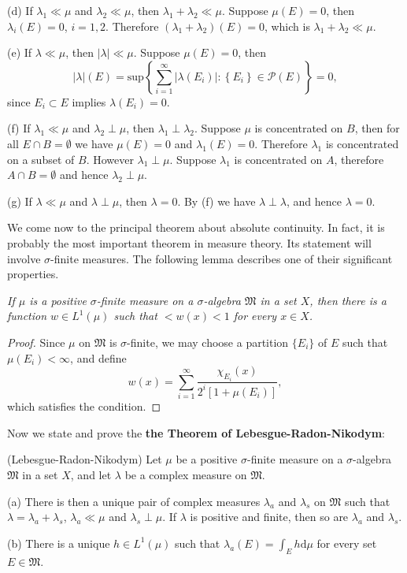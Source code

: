 (d) If $\lambda_1\ll\mu$ and $\lambda_2\ll\mu$, then $\lambda_1+\lambda_2\ll\mu$. Suppose $\mu(E)=0$, then $\lambda_i(E)=0$, $i=1,2$. Therefore $(\lambda_1+\lambda_2)(E)=0$, which is $\lambda_1+\lambda_2\ll\mu$.\par
(e) If $\lambda\ll\mu$, then $|\lambda|\ll\mu$. Suppose $\mu(E)=0$, then 
$$
\left| \lambda \right|\left( E \right) =\mathrm{sup}\left\{ \sum_{i=1}^{\infty}{\left| \lambda \left( E_i \right) \right|}:\left\{ E_i \right\} \in \mathcal{P} \left( E \right) \right\} =0,
$$
since $E_i\subset E$ implies $\lambda(E_i)=0$.\par
(f) If $\lambda_1\ll\mu$ and $\lambda_2\perp\mu$, then $\lambda_1\perp\lambda_2$. Suppose $\mu$ is concentrated on $B$, then for all $E\cap B=\emptyset$ we have $\mu(E)=0$ and $\lambda_1(E)=0$. Therefore $\lambda_1$ is concentrated on a subset of $B$. However $\lambda_1\perp\mu$. Suppose $\lambda_1$ is concentrated on $A$, therefore $A\cap B=\emptyset$ and hence $\lambda_2\perp\mu$.\par
(g) If $\lambda\ll\mu$ and $\lambda\perp\mu$, then $\lambda=0$. By (f) we have $\lambda\perp\lambda$, and hence $\lambda=0$.\par
We come now to the principal theorem about absolute continuity. In fact, it is probably the most important theorem in measure theory. Its statement will involve $\sigma$-finite measures. The following lemma describes one of their significant properties.
\begin{lemma}\em
If $\mu$ is a positive $\sigma$-finite measure on a $\sigma$-algebra $\mathfrak{M}$ in a set $X$, then there is a function $w\in L^1(\mu)$ such that $<w(x)<1$ for every $x\in X$.
\end{lemma}
\begin{proof}
Since $\mu$ on $\mathfrak{M}$ is $\sigma$-finite, we may choose a partition $\{E_i\}$ of $E$ such that $\mu(E_i)<\infty$, and define 
$$
w\left( x \right) =\sum_{i=1}^{\infty}{\frac{\chi _{E_i}\left( x \right)}{2^i\left[ 1+\mu \left( E_i \right) \right]}},
$$
which satisfies the condition.
\end{proof}
Now we state and prove the \textbf{the Theorem of Lebesgue-Radon-Nikodym}: 
\begin{theorem}(Lebesgue-Radon-Nikodym)
Let $\mu$ be a positive $\sigma$-finite measure on a $\sigma$-algebra $\mathfrak{M}$ in a set $X$, and let $\lambda$ be a complex measure on $\mathfrak{M}$.\par
(a) There is then a unique pair of complex measures $\lambda_a$ and $\lambda_s$ on $\mathfrak{M}$ such that $\lambda=\lambda_a+\lambda_s$, $\lambda_a\ll\mu$ and $\lambda_s\perp\mu$. If $\lambda$ is positive and finite, then so are $\lambda_a$ and $\lambda_s$.\par
(b) There is a unique $h\in L^1(\mu)$ such that $\lambda_a(E)=\int_Eh\mathrm{d}\mu$ for every set $E\in\mathfrak{M}$.
\end{theorem}
